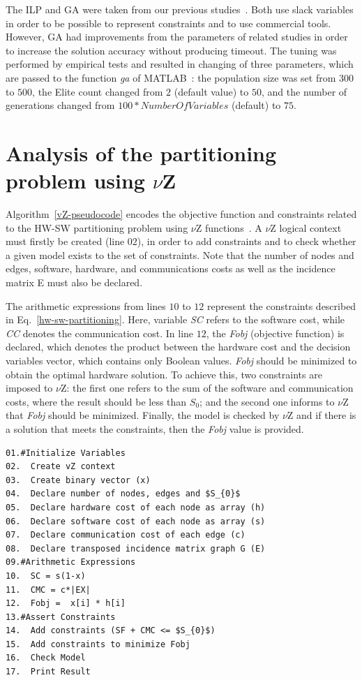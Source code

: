 The ILP and GA were taken from our previous studies~\cite{Trindade2015,Trindade2014}. Both use slack variables in order to be possible to represent constraints and to use commercial tools. However, GA had improvements from the parameters of related studies in order to increase the solution accuracy without producing timeout. The tuning was performed by empirical tests and resulted in changing of three parameters, which are passed to the function \textit{ga} of MATLAB~\cite{TheMathWorks2013}: the population size was set from $300$ to $500$, the Elite count changed from $2$ (default value) to $50$, and the number of generations changed from $100*NumberOfVariables$ (default) to $75$.

\section{Analysis of the partitioning problem using $\nu$Z}
\label{Analysis-of-the-partitioning-problem-using-vZ}

Algorithm~\ref{vZ-pseudocode} encodes the objective function and constraints related to the HW-SW partitioning problem using $\nu$Z functions~\cite{Bjorner2014}. A $\nu$Z logical context must firstly be created (line $02$), in order to add constraints and to check whether a given model exists to the set of constraints. Note that the number of nodes and edges, software, hardware, and communications costs as well as the incidence matrix E must also be declared.

The arithmetic expressions from lines $10$ to $12$ represent the constraints described in Eq.~\ref{hw-sw-partitioning}. Here, variable \textit{SC} refers to the software cost, while \textit{CC} denotes the communication cost. In line $12$, the \textit{Fobj} (objective function) is declared, which denotes the product between the hardware cost and the decision variables vector, which contains only Boolean values. \textit{Fobj} should be minimized to obtain the optimal hardware solution. To achieve this, two constraints are imposed to $\nu$Z: the first one refers to the sum of the software and communication costs, where the result should be less than $S_0$; and the second one informs to $\nu$Z that \textit{Fobj} should be minimized. Finally, the model is checked by $\nu$Z and if there is a solution that meets the constraints, then the \textit{Fobj} value is provided.

\begin{lstlisting}[caption=Pseudocode describing $\nu$Z,label=vZ-pseudocode, mathescape]
01.#Initialize Variables
02.  Create vZ context 
03.  Create binary vector (x)
04.  Declare number of nodes, edges and $S_{0}$
05.  Declare hardware cost of each node as array (h) 
06.  Declare software cost of each node as array (s)
07.  Declare communication cost of each edge (c)
08.  Declare transposed incidence matrix graph G (E)
09.#Arithmetic Expressions
10.  SC = s(1-x)
11.  CMC = c*|EX|
12.  Fobj =  x[i] * h[i]
13.#Assert Constraints
14.  Add constraints (SF + CMC <= $S_{0}$)
15.  Add constraints to minimize Fobj
16.  Check Model
17.  Print Result
\end{lstlisting}

